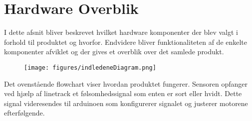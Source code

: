 \section{Hardware Overblik}

I dette afsnit bliver beskrevet hvilket hardware komponenter der blev valgt i forhold til produktet og hvorfor. Endvidere bliver funktionaliteten af de enkelte komponenter afviklet og der gives et overblik over det samlede produkt.

\begin{figure}[h!]
  \centering
  \texttt{[image: figures/indledeneDiagram.png]}
\end{figure} 

Det ovenstående flowchart viser hvordan produktet fungerer. Sensoren opfanger ved hjælp af linetrack et følsomhedssignal som enten er sort eller hvidt. Dette signal videresendes til arduinoen som konfigurerer signalet og justerer motorene efterfølgende.